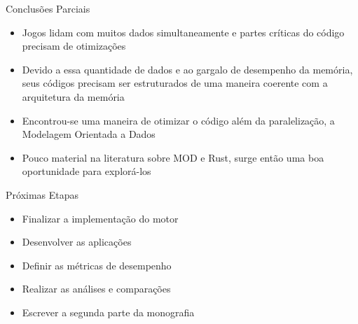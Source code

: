 \documentclass{beamer}
\begin{document}
\begin{frame}[t]{Conclusões Parciais}
    \begin{itemize}
        \item Jogos lidam com muitos dados simultaneamente e partes críticas do código 
            precisam de otimizações
        \item Devido a essa quantidade de dados e ao gargalo de desempenho da memória, 
            seus códigos precisam ser estruturados de uma maneira coerente com a 
            arquitetura da memória
        \item Encontrou-se uma maneira de otimizar o código além da paralelização, a 
            Modelagem Orientada a Dados
        \item Pouco material na literatura sobre MOD e Rust, surge então uma boa 
            oportunidade para explorá-los
    \end{itemize}
\end{frame}

\begin{frame}[t]{Próximas Etapas}
    \begin{itemize}
        \item Finalizar a implementação do motor
        \item Desenvolver as aplicações
        \item Definir as métricas de desempenho
        \item Realizar as análises e comparações
        \item Escrever a segunda parte da monografia
    \end{itemize}
\end{frame}
\end{document}

